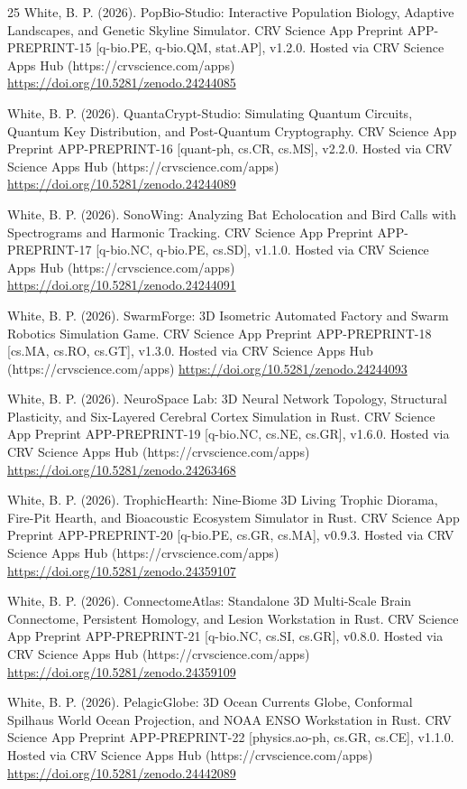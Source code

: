 \documentclass[10pt,letterpaper]{article}
\begin{document}
\begin{thebibliography}{25}
 White, B. P. (2026). PopBio-Studio: Interactive Population Biology, Adaptive Landscapes, and Genetic Skyline Simulator. CRV Science App Preprint APP-PREPRINT-15 [q-bio.PE, q-bio.QM, stat.AP], v1.2.0. Hosted via CRV Science Apps Hub (https://crvscience.com/apps) \url{https://doi.org/10.5281/zenodo.24244085}

 White, B. P. (2026). QuantaCrypt-Studio: Simulating Quantum Circuits, Quantum Key Distribution, and Post-Quantum Cryptography. CRV Science App Preprint APP-PREPRINT-16 [quant-ph, cs.CR, cs.MS], v2.2.0. Hosted via CRV Science Apps Hub (https://crvscience.com/apps) \url{https://doi.org/10.5281/zenodo.24244089}

 White, B. P. (2026). SonoWing: Analyzing Bat Echolocation and Bird Calls with Spectrograms and Harmonic Tracking. CRV Science App Preprint APP-PREPRINT-17 [q-bio.NC, q-bio.PE, cs.SD], v1.1.0. Hosted via CRV Science Apps Hub (https://crvscience.com/apps) \url{https://doi.org/10.5281/zenodo.24244091}

 White, B. P. (2026). SwarmForge: 3D Isometric Automated Factory and Swarm Robotics Simulation Game. CRV Science App Preprint APP-PREPRINT-18 [cs.MA, cs.RO, cs.GT], v1.3.0. Hosted via CRV Science Apps Hub (https://crvscience.com/apps) \url{https://doi.org/10.5281/zenodo.24244093}

 White, B. P. (2026). NeuroSpace Lab: 3D Neural Network Topology, Structural Plasticity, and Six-Layered Cerebral Cortex Simulation in Rust. CRV Science App Preprint APP-PREPRINT-19 [q-bio.NC, cs.NE, cs.GR], v1.6.0. Hosted via CRV Science Apps Hub (https://crvscience.com/apps) \url{https://doi.org/10.5281/zenodo.24263468}

 White, B. P. (2026). TrophicHearth: Nine-Biome 3D Living Trophic Diorama, Fire-Pit Hearth, and Bioacoustic Ecosystem Simulator in Rust. CRV Science App Preprint APP-PREPRINT-20 [q-bio.PE, cs.GR, cs.MA], v0.9.3. Hosted via CRV Science Apps Hub (https://crvscience.com/apps) \url{https://doi.org/10.5281/zenodo.24359107}

 White, B. P. (2026). ConnectomeAtlas: Standalone 3D Multi-Scale Brain Connectome, Persistent Homology, and Lesion Workstation in Rust. CRV Science App Preprint APP-PREPRINT-21 [q-bio.NC, cs.SI, cs.GR], v0.8.0. Hosted via CRV Science Apps Hub (https://crvscience.com/apps) \url{https://doi.org/10.5281/zenodo.24359109}

 White, B. P. (2026). PelagicGlobe: 3D Ocean Currents Globe, Conformal Spilhaus World Ocean Projection, and NOAA ENSO Workstation in Rust. CRV Science App Preprint APP-PREPRINT-22 [physics.ao-ph, cs.GR, cs.CE], v1.1.0. Hosted via CRV Science Apps Hub (https://crvscience.com/apps) \url{https://doi.org/10.5281/zenodo.24442089}


\end{thebibliography}
\end{document}
